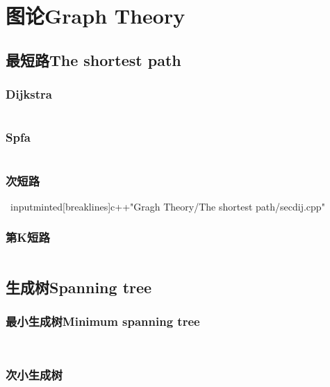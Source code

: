 \documentclass[twoside,sub3section,UTF8]{ctexart}						%
\begin{document}
\newpage
\section{图论Graph Theory}
	\subsection{最短路The shortest path}
		\subsubsection{Dijkstra}
			\inputminted[breaklines]{c++}{"Gragh Theory/The shortest path/dijkstra.cpp"}
		\subsubsection{Spfa}
			\inputminted[breaklines]{c++}{"Gragh Theory/The shortest path/spfa.cpp"}
		\subsubsection{次短路}
		\	inputminted[breaklines]{c++}{"Gragh Theory/The shortest path/secdij.cpp"}
		\subsubsection{第K短路}
			\inputminted[breaklines]{c++}{"Gragh Theory/The shortest path/Astar.cpp"}

	\subsection{生成树Spanning tree}
		\subsubsection{最小生成树Minimum spanning tree}
			\inputminted[breaklines]{c++}{"Gragh Theory/MST/kruskal.cpp"}
			\inputminted[breaklines]{c++}{"Gragh Theory/MST/prim.cpp"}
		\subsubsection{次小生成树}
			\inputminted{c++}{"Gragh Theory/MST/secmst.cpp"}
		
\end{document}
